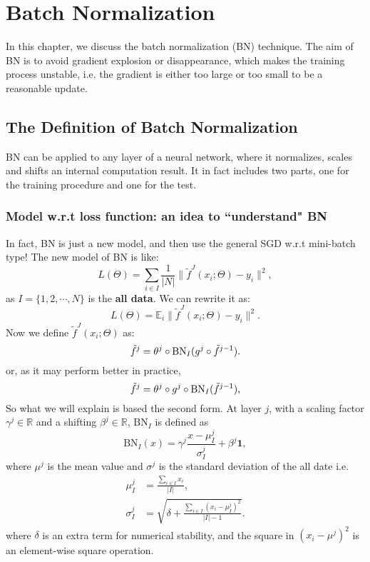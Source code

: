 \chapter{Batch Normalization}
In this chapter, we discuss the batch normalization (BN) technique. The aim of BN is to avoid gradient explosion or disappearance, which makes the training process unstable, i.e. the gradient is either too large or too small to be a reasonable update.

\section{The Definition of Batch Normalization}
BN can be applied to any layer of a neural network, where it normalizes, scales and shifts an internal computation result. It in fact includes two parts, one for the training procedure and one for the test.

\subsection{Model w.r.t loss function: an idea to ``understand" BN}
In fact, BN is just a new model, and then use the general SGD w.r.t mini-batch type! The new model of BN is like:
\begin{equation}\label{BN-model}
L(\Theta) = \sum_{i \in I} \frac{1}{|N|} \|\tilde {f}^J(x_i;\Theta) - y_i\|^2,
\end{equation}
as $I = \{1, 2,\cdots,N\}$ is the {\bf all data}.  
We can rewrite it as:
\begin{equation}\label{BN-model1}
L(\Theta) = \mathbb{E}_{i} \|\tilde {f}^J(x_i;\Theta) - y_i\|^2.
\end{equation}
Now we define $\tilde {f}^J(x_i;\Theta)$ as:
\begin{equation}
\tilde f^j = \theta^j \circ \text{\text{BN}}_{I} ( g^j\circ\tilde f^{j-1}).
\end{equation}
or, as it may perform better in practice,
\begin{equation}
\tilde f^j = \theta^j \circ g^j \circ \text{\text{BN}}_{I} (\tilde f^{j-1}),
\end{equation}
So what we will explain is based the second form.
At layer $j$, with a scaling factor $\gamma^j\in\mathbb{R}$ and a shifting $\beta^j \in \mathbb{R}$, $\text{BN}_I$ is defined as
\begin{equation}
\text{BN}_{I}(x)= \gamma^j\frac{x - \mu_I^j}{\sigma_I^j}+\beta^j \bm{1},
\end{equation}
where $\mu^j$ is the mean value and $\sigma^j$ is the standard deviation of the all date i.e.
\begin{align}
\mu_I^j &= \frac{\sum_{i\in I}  x_i }{|I|},\\
\sigma_I^j  &= \sqrt{ \delta + \frac{ \sum_{i\in I} ( x_i - \mu_I^j)^2}{|I|-1} }.
\end{align}
where $\delta$ is an extra term for numerical stability, and the square in $(  x_i - \mu^j)^2$ is an element-wise square operation.

